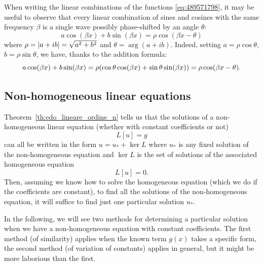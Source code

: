 % 
\begin{remark}
When writing the linear combinations of the functions 
\eqref{eq:489571798},
it may be useful to observe
that every linear combination of sines and cosines
with the same frequency $\beta$ is a single wave
possibly phase-shifted by an angle $\theta$:
\[
  a \cos (\beta x) + b \sin (\beta x)
  =
  \rho \cos(\beta x - \theta)
\]
where $\rho = {\left|a+ib\right|} = \sqrt{a^2+b^2}$ and 
$\theta=\arg(a+ib)$. 
Indeed,
setting $a=\rho\cos \theta$, $b=\rho \sin \theta$, we have,
thanks to the addition formula:
\[
   a \cos (\beta x) + b \sin (\beta x)
   = \rho{\left( \cos \theta \cos(\beta x) + \sin \theta \sin (\beta x) \right)}
   = \rho \cos(\beta x - \theta).
\]
\end{remark}

\subsection{Non-homogeneous linear equations}

Theorem~\ref{th:edo_lineare_ordine_n}
tells us that the solutions of a 
non-homogeneous linear equation (whether with constant coefficients or not)
\[
  L[u]=g
\]
can all be written in the form $u = u_* + \ker L$ where 
$u_*$ is any fixed solution of the non-homogeneous equation 
and $\ker L$ is the set of solutions of the associated homogeneous equation 
\[
  L[u] =0. 
\]
Then, assuming we know how to solve the homogeneous equation 
(which we do if the coefficients are constant),
to find all the solutions of the non-homogeneous equation, it will suffice 
to find just one particular solution $u_*$.

In the following, we will see two methods for determining a particular solution 
when we have a non-homogeneous equation with constant coefficients. 
The first method (of similarity) applies when the known term $g(x)$ takes a
specific form,
the second method (of variation of constants) applies in general, but it might
be
more laborious than the first.

